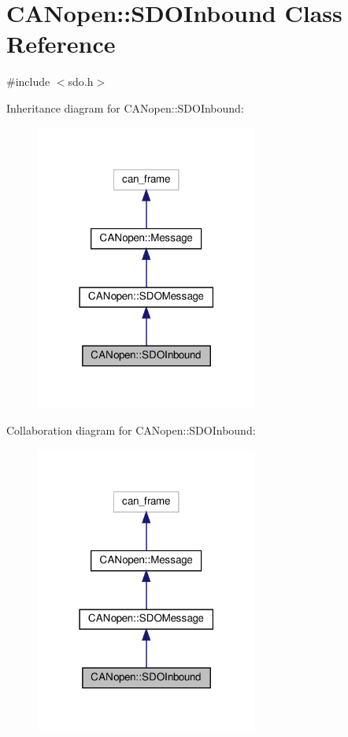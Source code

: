 \hypertarget{class_c_a_nopen_1_1_s_d_o_inbound}{}\section{C\+A\+Nopen\+:\+:S\+D\+O\+Inbound Class Reference}
\label{class_c_a_nopen_1_1_s_d_o_inbound}


{\ttfamily \#include $<$sdo.\+h$>$}



Inheritance diagram for C\+A\+Nopen\+:\+:S\+D\+O\+Inbound\+:\nopagebreak
\begin{figure}[H]
\begin{center}
\leavevmode
\includegraphics[width=207pt]{class_c_a_nopen_1_1_s_d_o_inbound__inherit__graph}
\end{center}
\end{figure}


Collaboration diagram for C\+A\+Nopen\+:\+:S\+D\+O\+Inbound\+:\nopagebreak
\begin{figure}[H]
\begin{center}
\leavevmode
\includegraphics[width=207pt]{class_c_a_nopen_1_1_s_d_o_inbound__coll__graph}
\end{center}
\end{figure}
